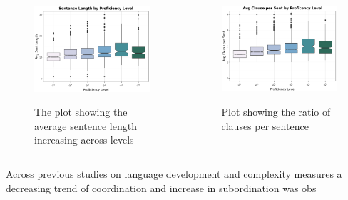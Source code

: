 \begin{columns}
\begin{figure}
    \includegraphics[scale=.5]{img/sentence_len}
    \label{fig:sentLen}
    \caption{The plot showing the average sentence length increasing across levels}
\end{figure}
    \begin{figure}
        \includegraphics[scale=.5]{img/clausesSent}
        \label{fig:cpersent}
        \caption{Plot showing the ratio of clauses per sentence}
    \end{figure}
\end{columns}

Across previous studies on language development and complexity
measures a decreasing trend of coordination and increase in subordination was obs




